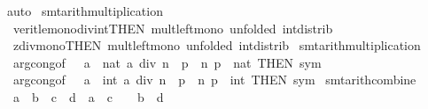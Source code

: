 \begin{isabellebody}
\ auto%
\endisatagproof
{\isafoldproof}%
%
\isadelimproof
\isanewline
%
\endisadelimproof
\isanewline
{}\isamarkupfalse%
\ {\isacharbrackleft}{\kern0pt}smt{\isacharunderscore}{\kern0pt}arith{\isacharunderscore}{\kern0pt}multiplication{\isacharbrackright}{\kern0pt}\ {\isacharequal}{\kern0pt}\isanewline
\ \ verit{\isacharunderscore}{\kern0pt}le{\isacharunderscore}{\kern0pt}mono{\isacharunderscore}{\kern0pt}div{\isacharunderscore}{\kern0pt}int{\isacharbrackleft}{\kern0pt}THEN\ mult{\isacharunderscore}{\kern0pt}left{\isacharunderscore}{\kern0pt}mono{\isacharcomma}{\kern0pt}\ unfolded\ int{\isacharunderscore}{\kern0pt}distrib{\isacharbrackright}{\kern0pt}\isanewline
\ \ zdiv{\isacharunderscore}{\kern0pt}mono{}{\isacharbrackleft}{\kern0pt}THEN\ mult{\isacharunderscore}{\kern0pt}left{\isacharunderscore}{\kern0pt}mono{\isacharcomma}{\kern0pt}\ unfolded\ int{\isacharunderscore}{\kern0pt}distrib{\isacharbrackright}{\kern0pt}\isanewline
\isanewline
{}\isamarkupfalse%
\ {\isacharbrackleft}{\kern0pt}smt{\isacharunderscore}{\kern0pt}arith{\isacharunderscore}{\kern0pt}multiplication{\isacharbrackright}{\kern0pt}\ {\isacharequal}{\kern0pt}\isanewline
\ \ arg{\isacharunderscore}{\kern0pt}cong{\isacharbrackleft}{\kern0pt}of\ {\isacharunderscore}{\kern0pt}\ {\isacharunderscore}{\kern0pt}\ {\isacartoucheopen}{\isasymlambda}a\ {\isacharcolon}{\kern0pt}{\isacharcolon}{\kern0pt}\ nat{\isachardot}{\kern0pt}\ a\ div\ n\ {\isacharasterisk}{\kern0pt}\ p{\isacartoucheclose}\ \ n\ p\ {\isacharcolon}{\kern0pt}{\isacharcolon}{\kern0pt}\ nat{\isacharcomma}{\kern0pt}\ THEN\ sym{\isacharbrackright}{\kern0pt}\isanewline
\ \ arg{\isacharunderscore}{\kern0pt}cong{\isacharbrackleft}{\kern0pt}of\ {\isacharunderscore}{\kern0pt}\ {\isacharunderscore}{\kern0pt}\ {\isacartoucheopen}{\isasymlambda}a\ {\isacharcolon}{\kern0pt}{\isacharcolon}{\kern0pt}\ int{\isachardot}{\kern0pt}\ a\ div\ n\ {\isacharasterisk}{\kern0pt}\ p{\isacartoucheclose}\ \ n\ p\ {\isacharcolon}{\kern0pt}{\isacharcolon}{\kern0pt}\ int{\isacharcomma}{\kern0pt}\ THEN\ sym{\isacharbrackright}{\kern0pt}\isanewline
\isanewline
{}\isamarkupfalse%
\ {\isacharbrackleft}{\kern0pt}smt{\isacharunderscore}{\kern0pt}arith{\isacharunderscore}{\kern0pt}combine{\isacharbrackright}{\kern0pt}{\isacharcolon}{\kern0pt}\isanewline
\ \ {\isachardoublequoteopen}a\ {\isacharless}{\kern0pt}\ b\ {\isasymLongrightarrow}\ c\ {\isacharless}{\kern0pt}\ d\ {\isasymLongrightarrow}\ a\ {\isacharplus}{\kern0pt}\ c\ {\isacharplus}{\kern0pt}\ {}\ {\isasymle}\ b\ {\isacharplus}{\kern0pt}\ d{\isachardoublequoteclose}\isanewline

\end{isabellebody}
